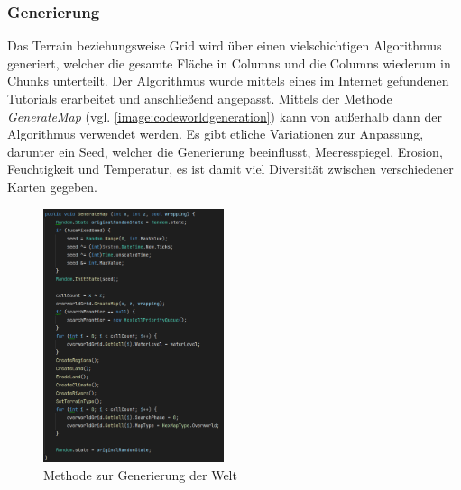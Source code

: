 \subsubsection{Generierung}
Das Terrain beziehungsweise Grid wird über einen vielschichtigen Algorithmus generiert, welcher die gesamte Fläche in Columns und die Columns wiederum in Chunks unterteilt. Der Algorithmus wurde mittels eines im Internet gefundenen Tutorials \cite*[]{world:tutorial} erarbeitet und anschließend angepasst. Mittels der Methode \textit{GenerateMap} (vgl. \autoref{image:codeworldgeneration}) kann von außerhalb dann der Algorithmus verwendet werden. Es gibt etliche Variationen zur Anpassung, darunter ein Seed, welcher die Generierung beeinflusst, Meeresspiegel, Erosion, Feuchtigkeit und Temperatur, es ist damit viel Diversität zwischen verschiedener Karten gegeben.

\begin{figure}
    \begin{center}
        \includegraphics[width=200px]{0.bilder/codeworldgeneration.png}
    \end{center}
    \caption{Methode zur Generierung der Welt} \label{image:codeworldgeneration}
\end{figure}